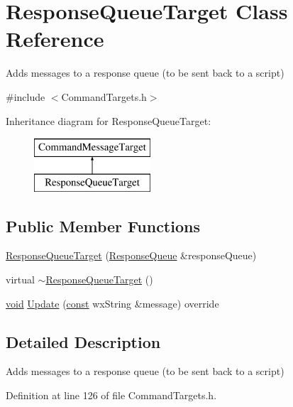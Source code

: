 \hypertarget{class_response_queue_target}{}\section{Response\+Queue\+Target Class Reference}
\label{class_response_queue_target}


Adds messages to a response queue (to be sent back to a script)  




{\ttfamily \#include $<$Command\+Targets.\+h$>$}

Inheritance diagram for Response\+Queue\+Target\+:\begin{figure}[H]
\begin{center}
\leavevmode
\includegraphics[height=2.000000cm]{class_response_queue_target}
\end{center}
\end{figure}
\subsection*{Public Member Functions}
\begin{DoxyCompactItemize}
\item 
\hyperlink{class_response_queue_target_aebc27a3c02826e31c79768e22adad9d0}{Response\+Queue\+Target} (\hyperlink{class_response_queue}{Response\+Queue} \&response\+Queue)
\item 
virtual \hyperlink{class_response_queue_target_a1d22467c366654a0b02127cf64a539e0}{$\sim$\+Response\+Queue\+Target} ()
\item 
\hyperlink{sound_8c_ae35f5844602719cf66324f4de2a658b3}{void} \hyperlink{class_response_queue_target_a9c141cec25e16820dc434005150153e3}{Update} (\hyperlink{getopt1_8c_a2c212835823e3c54a8ab6d95c652660e}{const} wx\+String \&message) override
\end{DoxyCompactItemize}


\subsection{Detailed Description}
Adds messages to a response queue (to be sent back to a script) 

Definition at line 126 of file Command\+Targets.\+h.



